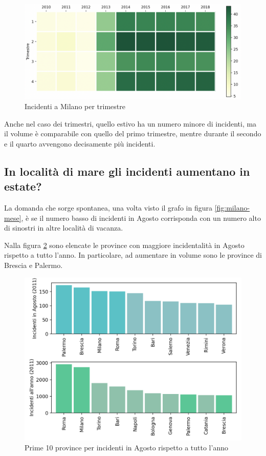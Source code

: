 \documentclass[a4paper]{report}
\begin{document}
\begin{figure}
    \includegraphics[width=\linewidth]{../src/incidenti/incidenti_senza_coords/mese_incidenti/trimestri.png}
    \caption{Incidenti a Milano per trimestre}
    \label{fig:milano-trimestri}
\end{figure}

Anche nel caso dei trimestri, quello estivo ha un numero minore di incidenti, ma il volume è 
comparabile con quello del primo trimestre, mentre durante il secondo e il quarto avvengono 
decisamente più incidenti.


\subsection{In località di mare gli incidenti aumentano in estate?}

La domanda che sorge spontanea, una volta visto il grafo in figura \ref{fig:milano-mese}, è se 
il numero basso di incidenti in Agosto corrisponda con un numero alto di sinostri in altre località 
di vacanza. 

Nalla figura \ref{fig:mesi-estivi} sono elencate le province con maggiore incidentalità 
in Agosto rispetto a tutto l'anno. In particolare, ad aumentare in volume sono le 
province di Brescia e Palermo.

\begin{figure}
    \includegraphics[width=\linewidth]{../src/incidenti/incidenti_senza_coords/mese_incidenti/mesi_estivi.png}
    \caption{Prime 10 province per incidenti in Agosto rispetto a tutto l'anno}
    \label{fig:mesi-estivi}
\end{figure}
\end{document}
